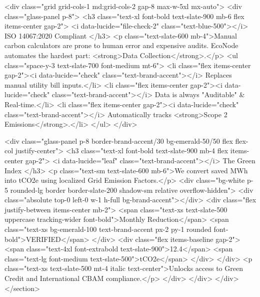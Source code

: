                 <div class="grid grid-cols-1 md:grid-cols-2 gap-8 max-w-5xl mx-auto">
                    <div class="glass-panel p-8">
                        <h3 class="text-xl font-bold text-slate-900 mb-6 flex items-center gap-2">
                            <i data-lucide="file-check-2" class="text-blue-500"></i> ISO 14067:2020 Compliant
                        </h3>
                        <p class="text-slate-600 mb-4">Manual carbon calculators are prone to human error and expensive audits. EcoNode automates the hardest part: <strong>Data Collection</strong>.</p>
                        <ul class="space-y-3 text-slate-700 font-medium mt-6">
                            <li class="flex items-center gap-2"><i data-lucide="check" class="text-brand-accent"></i> Replaces manual utility bill inputs.</li>
                            <li class="flex items-center gap-2"><i data-lucide="check" class="text-brand-accent"></i> Data is always "Auditable" & Real-time.</li>
                            <li class="flex items-center gap-2"><i data-lucide="check" class="text-brand-accent"></i> Automatically tracks <strong>Scope 2 Emissions</strong>.</li>
                        </ul>
                    </div>
                    
                    <div class="glass-panel p-8 border-brand-accent/30 bg-emerald-50/50 flex flex-col justify-center">
                        <h3 class="text-xl font-bold text-slate-900 mb-4 flex items-center gap-2">
                            <i data-lucide="leaf" class="text-brand-accent"></i> The Green Index
                        </h3>
                        <p class="text-sm text-slate-600 mb-6">We convert saved MWh into tCO2e using localized Grid Emission Factors.</p>
                        <div class="bg-white p-5 rounded-lg border border-slate-200 shadow-sm relative overflow-hidden">
                            <div class="absolute top-0 left-0 w-1 h-full bg-brand-accent"></div>
                            <div class="flex justify-between items-center mb-2">
                                <span class="text-xs text-slate-500 uppercase tracking-wider font-bold">Monthly Reduction</span>
                                <span class="text-xs bg-emerald-100 text-brand-accent px-2 py-1 rounded font-bold">VERIFIED</span>
                            </div>
                            <div class="flex items-baseline gap-2">
                                <span class="text-4xl font-extrabold text-slate-900">12.4</span>
                                <span class="text-lg font-medium text-slate-500">tCO2e</span>
                            </div>
                        </div>
                        <p class="text-xs text-slate-500 mt-4 italic text-center">Unlocks access to Green Credit and International CBAM compliance.</p>
                    </div>
                </div>
            </div>
        </section>

